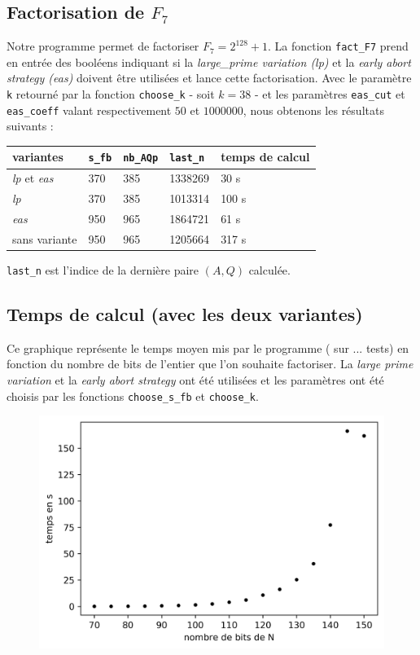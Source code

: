 \subsection{Factorisation de $F_7$}

Notre programme permet de factoriser $F_7 = 2^{128} + 1$. La fonction 
\texttt{fact\_F7} prend en entrée des booléens indiquant si la
\textit{large\_prime variation (lp)} et la \textit{early abort strategy (eas)}
doivent être utilisées et lance cette factorisation. Avec le paramètre \texttt{k}
retourné par la fonction \texttt{choose\_k} - soit $k=38$ - et les paramètres 
\texttt{eas\_cut} et \texttt{eas\_coeff} valant respectivement $50$ et $1000000$,
nous obtenons les résultats suivants :  

\begin{center}
     \begin{tabular}{| l | l| l | l | l |}
     \hline
     variantes                    & \texttt{s\_fb} & \texttt{nb\_AQp} & \texttt{last\_n} & temps de calcul  \\ \hline
     \textit{lp} et \textit{eas}  &     370        &  385             &    1338269       &   30 s           \\ \hline
     \textit{lp}                  &     370        &  385             &    1013314       &   100 s          \\ \hline
     \textit{eas}                 &     950        &  965             &    1864721       &   61 s           \\ \hline
     sans variante                &     950        &  965             &    1205664       &   317 s          \\ \hline
    \end{tabular}
\end{center}

\hspace*{1.6 cm} \footnotesize{\texttt{last\_n} est l'indice de la dernière paire $(A,Q)$
calculée.}

\subsection{Temps de calcul (avec les deux variantes) }

Ce graphique représente le temps moyen mis par le programme ( sur ... tests)
en fonction du nombre de bits de l'entier que l'on souhaite factoriser. La
\textit{large prime variation} et la \textit{early abort strategy} ont été 
utilisées et les paramètres ont été choisis par les fonctions 
\texttt{choose\_s\_fb} et \texttt{choose\_k}.\\

\begin{figure}[h]
\begin{center}
\includegraphics[width = 7 cm ]{graphique.png}
\end{center}
\end{figure}
